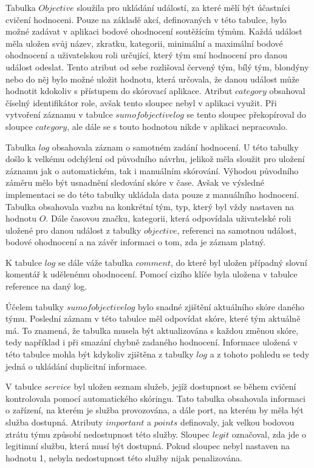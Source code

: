 \documentclass[
  digital, %
  twoside, %
  table,   %
  lof,     %
  lot,     %
]{fithesis3}
\begin{document}
Tabulka $Objective$ sloužila pro ukládání událostí, za které mělí být účastníci cvičení hodnoceni. Pouze na základě akcí, definovaných v této tabulce, bylo možné zadávat v aplikaci bodové ohodnocení soutěžícím týmům. Každá událost měla uložen svůj název, zkratku, kategorii, minimální a maximální bodové ohodnocení a uživatelskou roli určující, který tým smí hodnocení pro danou událost odeslat. Tento atribut od sebe rozlišoval červený tým, bílý tým, blondýny nebo do něj bylo možné uložit hodnotu, která určovala, že danou událost může hodnotit kdokoliv s přístupem do skórovací aplikace. Atribut $category$ obsahoval číselný identifikátor role, avšak tento sloupec nebyl v aplikaci využit. Při vytvoření záznamu v tabulce $sumofobjectivelog$ se tento sloupec překopíroval do sloupce $category$, ale dále se s touto hodnotou nikde v aplikaci nepracovalo.

Tabulka $log$ obsahovala záznam o samotném zadání hodnocení. U této tabulky došlo k velkému odchýlení od původního návrhu, jelikož měla sloužit pro uložení záznamu jak o automatickém, tak i manuálním skórování. Výhodou původního záměru mělo být usnadnění sledování skóre v čase. Avšak ve výsledné implementaci se do této tabulky ukládala data pouze z manuálního hodnocení. Tabulka obsahovala vazbu na konkrétní tým, typ, který byl vždy nastaven na hodnotu $O$. Dále časovou značku, kategorii, která odpovídala uživatelské roli uložené pro danou událost z tabulky $objective$, referenci na samotnou událost, bodové ohodnocení a na závěr informaci o tom, zda je záznam platný. 

K tabulce $log$ se dále váže tabulka $comment$, do které byl uložen případný slovní komentář k udělenému ohodnocení. Pomocí cizího klíče byla uložena v tabulce reference na daný log.

Účelem tabulky $sumofobjectivelog$ bylo snadné zjištění aktuálního skóre daného týmu. Poslední záznam v této tabulce měl odpovídat skóre, které tým aktuálně má. To znamená, že tabulka musela být aktualizována s každou změnou skóre, tedy například i při smazání chybně zadaného hodnocení. Informace uložená v této tabulce mohla být kdykoliv zjištěna z tabulky $log$ a z tohoto pohledu se tedy jedná o ukládání duplicitní informace.

V tabulce $service$ byl uložen seznam služeb, jejíž dostupnost se během cvičení kontrolovala pomocí automatického skóringu. Tato tabulka obsahovala informaci o zařízení, na kterém je služba provozována, a dále port, na kterém by měla být služba dostupná. Atributy $important$ a $points$ definovaly, jak velkou bodovou ztrátu týmu způsobí nedostupnost této služby. Sloupec $legit$ označoval, zda jde o legitimní službu, která musí být dostupná. Pokud sloupec nebyl nastaven na hodnotu 1, nebyla nedostupnost této služby nijak penalizována. 
\end{document}
